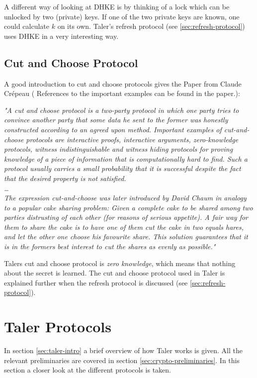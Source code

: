 A different way of looking at \ac{DHKE} is by thinking of a lock which can be unlocked by two (private) keys.
If one of the two private keys are known, one could calculate $k$ on its own.
Taler's refresh protocol (see \ref{sec:refresh-protocol}) uses \ac{DHKE} in a very interesting way.

\subsection{Cut and Choose Protocol}
\label{sec:preliminaries-cut-choose}
A good introduction to cut and choose protocols gives the Paper from Claude Crépeau (\cite{Crépeau2005} References to the important examples can be found in the paper.):
\begin{center}
    \textit{
        "A cut and choose protocol is a two-party protocol in which one party tries to convince another party that some data he sent to the former was honestly constructed according to an agreed upon method.
        Important examples of cut-and-choose protocols are interactive proofs, interactive arguments, zero-knowledge protocols, witness indistinguishable and witness hiding protocols for proving knowledge of a piece of information that is computationally hard to find.
        Such a protocol usually carries a small probability that it is successful despite the fact that the desired property is not satisfied.
        \\\dots\\
        The expression cut-and-choose was later introduced by David Chaum in analogy to a popular cake sharing problem:
        Given a complete cake to be shared among two parties distrusting of each other (for reasons of serious appetite).
        A fair way for them to share the cake is to have one of them cut the cake in two equals hares, and let the other one choose his favourite share.
        This solution guarantees that it is in the formers best interest to cut the shares as evenly as possible."
    }
\end{center}

Talers cut and choose protocol is \textit{zero knowledge}, which means that nothing about the secret is learned.
The cut and choose protocol used in Taler is explained further when the refresh protocol is discussed (see \ref{sec:refresh-protocol}).

\section{Taler Protocols}
In section \ref{sec:taler-intro} a brief overview of how \acl{Taler} works is given. All the relevant preliminaries are covered in section \ref{sec:crypto-preliminaries}.
In this section a closer look at the different protocols is taken.

